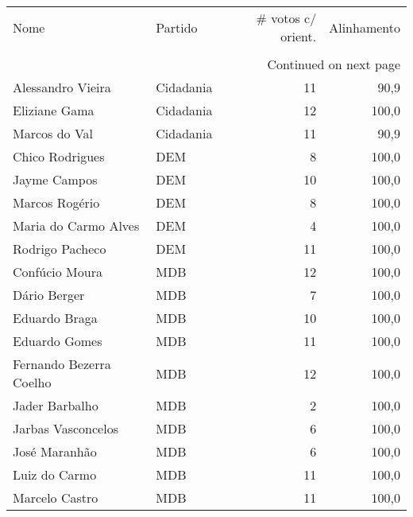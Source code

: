 \begin{longtable}{llrr}
\toprule
                    Nome &        Partido &  \# votos c/ orient. &  Alinhamento \\
                         &                &                     &              \\
\midrule
\endhead
\midrule
\multicolumn{4}{r}{{Continued on next page}} \\
\midrule
\endfoot

\bottomrule
\endlastfoot
       Alessandro Vieira &      Cidadania &                  11 &         90,9 \\
           Eliziane Gama &      Cidadania &                  12 &        100,0 \\
           Marcos do Val &      Cidadania &                  11 &         90,9 \\
         Chico Rodrigues &            DEM &                   8 &        100,0 \\
            Jayme Campos &            DEM &                  10 &        100,0 \\
          Marcos Rogério &            DEM &                   8 &        100,0 \\
    Maria do Carmo Alves &            DEM &                   4 &        100,0 \\
         Rodrigo Pacheco &            DEM &                  11 &        100,0 \\
          Confúcio Moura &            MDB &                  12 &        100,0 \\
            Dário Berger &            MDB &                   7 &        100,0 \\
           Eduardo Braga &            MDB &                  10 &        100,0 \\
           Eduardo Gomes &            MDB &                  11 &        100,0 \\
 Fernando Bezerra Coelho &            MDB &                  12 &        100,0 \\
          Jader Barbalho &            MDB &                   2 &        100,0 \\
      Jarbas Vasconcelos &            MDB &                   6 &        100,0 \\
           José Maranhão &            MDB &                   6 &        100,0 \\
           Luiz do Carmo &            MDB &                  11 &        100,0 \\
          Marcelo Castro &            MDB &                  11 &        100,0 \\

\end{longtable}
